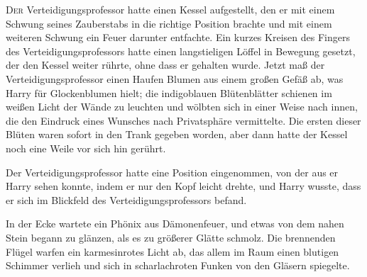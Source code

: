 
\lettrine{D}{er} Verteidigungsprofessor hatte einen Kessel aufgestellt, den er mit einem Schwung seines Zauberstabs in die richtige Position brachte und mit einem weiteren Schwung ein Feuer darunter entfachte. Ein kurzes Kreisen des Fingers des Verteidigungsprofessors hatte einen langstieligen Löffel in Bewegung gesetzt, der den Kessel weiter rührte, ohne dass er gehalten wurde. Jetzt maß der Verteidigungsprofessor einen Haufen Blumen aus einem großen Gefäß ab, was Harry für Glockenblumen hielt; die indigoblauen Blütenblätter schienen im weißen Licht der Wände zu leuchten und wölbten sich in einer Weise nach innen, die den Eindruck eines Wunsches nach Privatsphäre vermittelte. Die ersten dieser Blüten waren sofort in den Trank gegeben worden, aber dann hatte der Kessel noch eine Weile vor sich hin gerührt.

Der Verteidigungsprofessor hatte eine Position eingenommen, von der aus er Harry sehen konnte, indem er nur den Kopf leicht drehte, und Harry wusste, dass er sich im Blickfeld des Verteidigungsprofessors befand.

In der Ecke wartete ein Phönix aus Dämonenfeuer, und etwas von dem nahen Stein begann zu glänzen, als es zu größerer Glätte schmolz. Die brennenden Flügel warfen ein karmesinrotes Licht ab, das allem im Raum einen blutigen Schimmer verlieh und sich in scharlachroten Funken von den Gläsern spiegelte.

